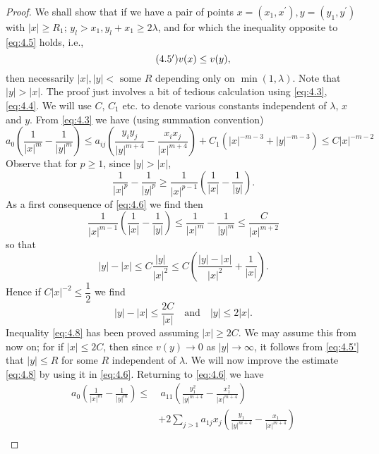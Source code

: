 \begin{proof}
	We shall show that if we have a pair of points $x=(x_1, x^{\prime}), y=(y_1,y^{\prime})$ with $|x| \geq  R_1$; $y_l >x_1, y_l +x_1 \geq  2\lambda$, and for which the inequality opposite to \eqref{eq:4.5} holds, i.e.,
	\begin{equation}\tag{4.5$^{\prime}$}\label{eq:4.5'}
		v(x) \leq  v(y), 
	\end{equation}
	then necessarily $|x|, |y| <\text{ some }R$ depending only on $\min (1, \lambda)$. Note that $|y| > |x|$. The proof just involves a bit of tedious calculation using \eqref{eq:4.3}, \eqref{eq:4.4}. We will use $C$, $C_1$ etc. to denote various constants independent of $\lambda$, $x$ and $y$. From \eqref{eq:4.3} we have (using summation convention)
	\begin{equation}\label{eq:4.6}
		a_0\left( \frac{1}{|x|^m} - \frac{1}{|y|^m} \right) \leq  a_{ij}\left( \frac{y_iy_j}{|y|^{m+4}} - \frac{x_ix_j}{|x|^{m+4}} \right) + C_1 ( |x|^{-m-3}+|y|^{-m-3} ) \leq  C|x|^{-m-2}
	\end{equation}
	Observe that for $p \geq  1$, since $|y|>|x|$,
	\begin{equation}\label{eq:4.7}
		\frac{1}{|x|^p} - \frac{1}{|y|^p} \geq  \frac{1}{|x|^{p-1}} \left(\frac{1}{|x|}-\frac{1}{|y|}\right).
	\end{equation}
	As a first consequence of \eqref{eq:4.6} we find then
 	\[ \frac{1}{|x|^{m-1}} \left(\frac{1}{|x|}-\frac{1}{|y|}\right) \leq  \frac{1}{|x|^m} - \frac{1}{|y|^m} \leq  \frac{C}{|x|^{m+2}} \]
	so that
	\[ |y|-|x|\leq  C\frac{|y|}{|x|^2} \leq C\left( \frac{|y|-|x|}{|x|^2} + \frac{1}{|x|} \right). \]
	Hence if $C|x|^{-2}\leq \dfrac{1}{2}$ we find
	\begin{equation}\label{eq:4.8}
		|y|-|x|\leq \frac{2C}{|x|} \quad\text{and}\quad|y|\leq 2|x|.
	\end{equation}
	Inequality \eqref{eq:4.8} has been proved assuming $|x|\geq  2C$. We may assume this from now on; for if $|x|\leq  2C$, then since $v(y)\rightarrow0$ as $|y|\rightarrow\infty$, it follows from \eqref{eq:4.5'} that $|y|\leq R$ for some $R$ independent of $\lambda$.
	We will now improve the estimate \eqref{eq:4.8} by using it in \eqref{eq:4.6}. Returning to \eqref{eq:4.6} we have
		\[\begin{aligned}
		a_0\left(\frac{1}{|x|^m} - \frac{1}{|y|^m}\right) \leq &\ a_{11} \left( \frac{y_1^2}{|y|^{m+4}} - \frac{x_1^2}{|x|^{m+4}} \right)\\
		&+ 2\sum_{j>1} a_{1j} x_j \left( \frac{y_1}{|y|^{m+4}} - \frac{x_1}{|x|^{m+4}} \right)\\

\end{aligned}\]
\end{proof}
